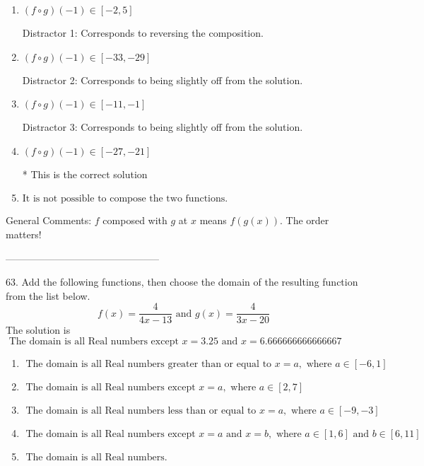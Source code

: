 \documentclass{article}[14pt]
\begin{document}
\begin{enumerate}[label=\Alph*.] 
\item $ (f \circ g)(-1) \in [-2, 5] $ 

  Distractor 1: Corresponds to reversing the composition. 
\item $ (f \circ g)(-1) \in [-33, -29] $ 

  Distractor 2: Corresponds to being slightly off from the solution. 
\item $ (f \circ g)(-1) \in [-11, -1] $ 

  Distractor 3: Corresponds to being slightly off from the solution. 
\item $ (f \circ g)(-1) \in [-27, -21] $ 

 * This is the correct solution 
\item $ \text{It is not possible to compose the two functions.} $ 

  
\end{enumerate} 
 
General Comments: $f$ composed with $g$ at $x$ means $f(g(x))$. The order matters!

-----------------------------------------------

63. Add the following functions, then choose the domain of the resulting function from the list below.
$$ f(x) = \frac{4}{4x-13} \text{ and } g(x) = \frac{4}{3x-20} $$ 
The solution is $ \text{ The domain is all Real numbers except } x = 3.25 \text{ and } x = 6.666666666666667 $ 

\begin{enumerate}[label=\Alph*.] 
\item $ \text{ The domain is all Real numbers greater than or equal to } x = a, \text{ where } a \in [-6, 1] $ 

  
\item $ \text{ The domain is all Real numbers except } x = a, \text{ where } a \in [2, 7] $ 

  
\item $ \text{ The domain is all Real numbers less than or equal to } x = a, \text{ where } a \in [-9, -3] $ 

  
\item $ \text{ The domain is all Real numbers except } x = a \text{ and } x = b, \text{ where } a \in [1, 6] \text{ and } b \in [6, 11] $ 

  
\item $ \text{ The domain is all Real numbers. } $ 

  
\end{enumerate} 
 
\end{document}
